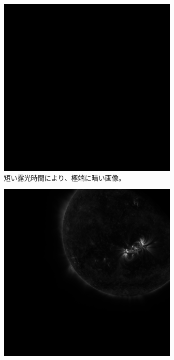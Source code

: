 \begin{figure}[htbp]
    \centering
    \begin{subfigure}[b]{0.48\textwidth}
        \includegraphics[width=\textwidth]{figures/bad_sample0.png}
        \caption{短い露光時間により、極端に暗い画像。}
    \end {subfigure}
    \hfill
    \begin{subfigure}[b]{0.48\textwidth}
        \includegraphics[width=\textwidth]{figures/bad_sample1.png}

\end{subfigure}
\end{figure}
